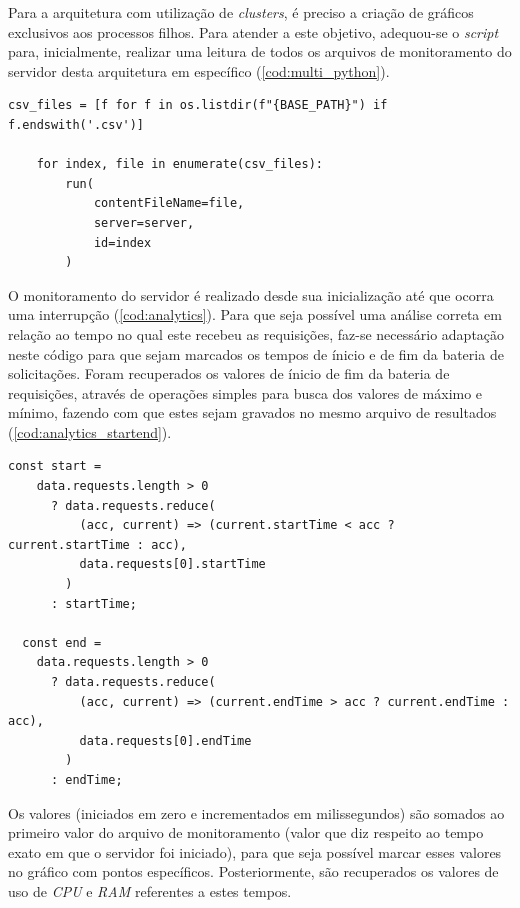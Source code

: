\documentclass[12pt]{article}
\begin{document}
Para a arquitetura com utilização de \textit{clusters}, é preciso a criação de gráficos exclusivos aos processos
filhos. Para atender a este objetivo, adequou-se o \textit{script} para, 
inicialmente, realizar uma leitura de todos os arquivos de monitoramento do servidor desta arquitetura em específico (\autoref{cod:multi_python}).

\begin{lstlisting}[caption={Geração dos gráficos para servidor com arquitetura de \textit{cluster}}, label=cod:multi_python]
	csv_files = [f for f in os.listdir(f"{BASE_PATH}") if f.endswith('.csv')]

	for index, file in enumerate(csv_files):
		run(
			contentFileName=file,
			server=server,
			id=index
		)
\end{lstlisting}

O monitoramento do servidor é realizado desde sua inicialização até que ocorra uma interrupção (\autoref{cod:analytics}). Para que seja possível uma
análise correta em relação ao tempo no qual este recebeu as requisições, faz-se necessário adaptação neste código para
que sejam marcados os tempos de ínicio e de fim da bateria de solicitações. Foram recuperados os valores de ínicio de fim da bateria de
requisições, através de operações simples para busca dos valores de máximo e mínimo, fazendo com que estes sejam
gravados no mesmo arquivo de resultados (\autoref{cod:analytics_startend}).

\begin{lstlisting}[caption={Recuperação dos valores de início e fim da bateria de solicitações.}, label=cod:analytics_startend]
	const start =
    data.requests.length > 0
      ? data.requests.reduce(
          (acc, current) => (current.startTime < acc ? current.startTime : acc),
          data.requests[0].startTime
        )
      : startTime;

  const end =
    data.requests.length > 0
      ? data.requests.reduce(
          (acc, current) => (current.endTime > acc ? current.endTime : acc),
          data.requests[0].endTime
        )
      : endTime;
\end{lstlisting}

Os valores (iniciados em zero e incrementados em milissegundos) são somados ao primeiro valor do arquivo de monitoramento
(valor que diz respeito ao tempo exato em que o servidor foi iniciado), para que seja possível marcar esses valores no 
gráfico com pontos específicos. Posteriormente, são recuperados os valores de uso de \textit{CPU} e \textit{RAM} referentes
a estes tempos.
\end{document}
